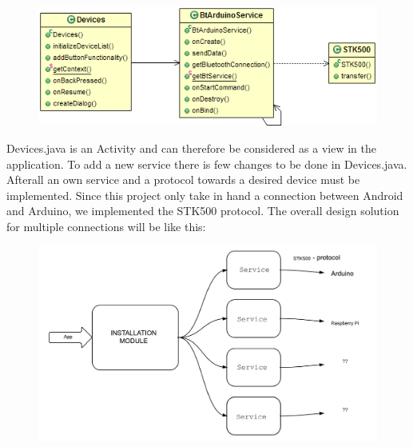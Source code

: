 	\begin{figure}[H]
	\centering
	\includegraphics[width=130mm]{images/BTConnection.png}
	\end{figure}

	Devices.java is an Activity and can therefore be considered as a view in the application. To add a new service there is few changes to be done in Devices.java. Afterall an own service and a protocol towards a desired device must be implemented. Since this project only take in hand a connection between Android and Arduino, we implemented the STK500 protocol.
	The overall design solution for multiple connections will be like this:\\

	\begin{figure}[H]
	\includegraphics[scale=0.7]{figures/OTAArchitecture.pdf}
	\end{figure}
